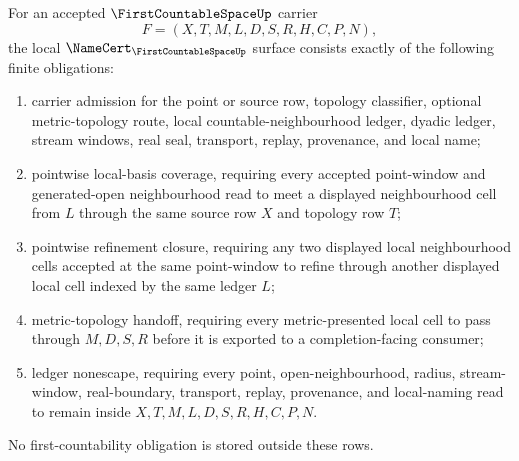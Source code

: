 \begin{theorem}
\label{thm:first-countable-space-namecert-obligations}
For an accepted $\FirstCountableSpaceUp$ carrier
$$
F=(X,T,M,L,D,S,R,H,C,P,N),
$$
the local $\NameCert_{\FirstCountableSpaceUp}$ surface consists exactly of the following finite obligations:
\begin{enumerate}
\item carrier admission for the point or source row, topology classifier, optional metric-topology route, local countable-neighbourhood ledger, dyadic ledger, stream windows, real seal, transport, replay, provenance, and local name;
\item pointwise local-basis coverage, requiring every accepted point-window and generated-open neighbourhood read to meet a displayed neighbourhood cell from $L$ through the same source row $X$ and topology row $T$;
\item pointwise refinement closure, requiring any two displayed local neighbourhood cells accepted at the same point-window to refine through another displayed local cell indexed by the same ledger $L$;
\item metric-topology handoff, requiring every metric-presented local cell to pass through $M,D,S,R$ before it is exported to a completion-facing consumer;
\item ledger nonescape, requiring every point, open-neighbourhood, radius, stream-window, real-boundary, transport, replay, provenance, and local-naming read to remain inside $X,T,M,L,D,S,R,H,C,P,N$.
\end{enumerate}
No first-countability obligation is stored outside these rows.
\end{theorem}

